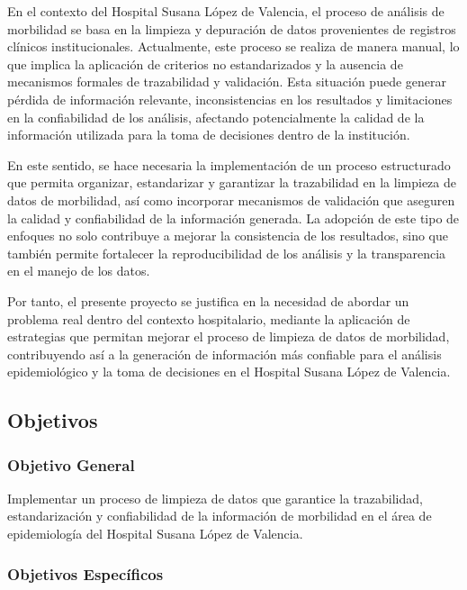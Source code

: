 \documentclass[12pt, letterpaper, oneside]{article}
\begin{document}
En el contexto del Hospital Susana López de Valencia, el proceso de análisis de morbilidad se basa en la limpieza y depuración de datos provenientes de registros clínicos institucionales. Actualmente, este proceso se realiza de manera manual, lo que implica la aplicación de criterios no estandarizados y la ausencia de mecanismos formales de trazabilidad y validación. Esta situación puede generar pérdida de información relevante, inconsistencias en los resultados y limitaciones en la confiabilidad de los análisis, afectando potencialmente la calidad de la información utilizada para la toma de decisiones dentro de la institución.

En este sentido, se hace necesaria la implementación de un proceso estructurado que permita organizar, estandarizar y garantizar la trazabilidad en la limpieza de datos de morbilidad, así como incorporar mecanismos de validación que aseguren la calidad y confiabilidad de la información generada. La adopción de este tipo de enfoques no solo contribuye a mejorar la consistencia de los resultados, sino que también permite fortalecer la reproducibilidad de los análisis y la transparencia en el manejo de los datos.

Por tanto, el presente proyecto se justifica en la necesidad de abordar un problema real dentro del contexto hospitalario, mediante la aplicación de estrategias que permitan mejorar el proceso de limpieza de datos de morbilidad, contribuyendo así a la generación de información más confiable para el análisis epidemiológico y la toma de decisiones en el Hospital Susana López de Valencia.

\subsection{Objetivos}

\subsubsection{Objetivo General}

Implementar un proceso de limpieza de datos que garantice la trazabilidad, estandarización y confiabilidad de la información de morbilidad en el área de epidemiología del Hospital Susana López de Valencia.

\subsubsection{Objetivos Específicos}
\end{document}
